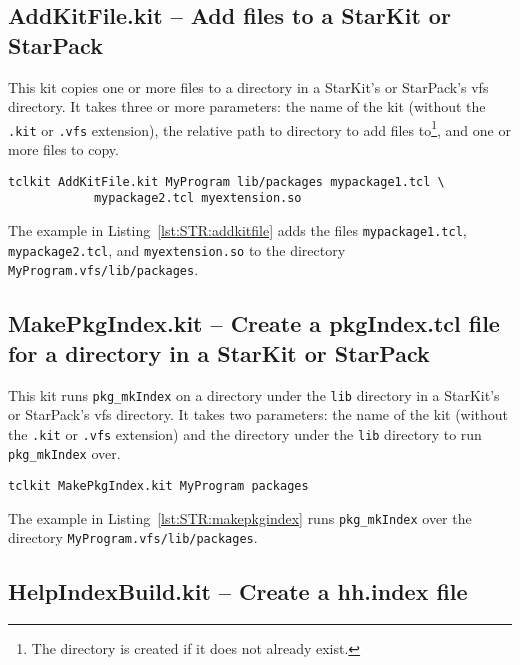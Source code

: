 \subsection{AddKitFile.kit -- Add files to a StarKit or StarPack}

This kit copies one or more files to a directory in
a StarKit's or StarPack's vfs directory. It takes three or more
parameters: the name of the kit (without the \lstinline=.kit= or
\lstinline=.vfs= extension), the relative path to directory to add files
to\footnote{The directory is created if it does not already exist.}, and
one or more files to copy.

\begin{lstlisting}[label={lst:STR:addkitfile},caption={Adding files to a
 kit.}]
tclkit AddKitFile.kit MyProgram lib/packages mypackage1.tcl \
			mypackage2.tcl myextension.so 
\end{lstlisting}

The example in Listing~\ref{lst:STR:addkitfile} adds the files
\lstinline=mypackage1.tcl=, \lstinline=mypackage2.tcl=, and
\lstinline=myextension.so= to the directory
\lstinline=MyProgram.vfs/lib/packages=. 

\subsection{MakePkgIndex.kit -- Create a pkgIndex.tcl file for a
directory in a StarKit or StarPack}

This kit runs \lstinline=pkg_mkIndex= on a directory under the
\lstinline=lib= directory in a StarKit's or StarPack's vfs directory. It
takes two parameters: the name of the kit (without the \lstinline=.kit=
or \lstinline=.vfs= extension) and the directory under the
\lstinline=lib= directory to run \lstinline=pkg_mkIndex= over.

\begin{lstlisting}[label={lst:STR:makepkgindex},caption={Creating the
pkgIndex.tcl for a directory of packages in a kit.}]
tclkit MakePkgIndex.kit MyProgram packages
\end{lstlisting}

The example in Listing~\ref{lst:STR:makepkgindex} runs 
\lstinline=pkg_mkIndex= over the directory
\lstinline=MyProgram.vfs/lib/packages=. 

\subsection{HelpIndexBuild.kit -- Create a hh.index file}
\label{sect:STR:helpindexbuild}

